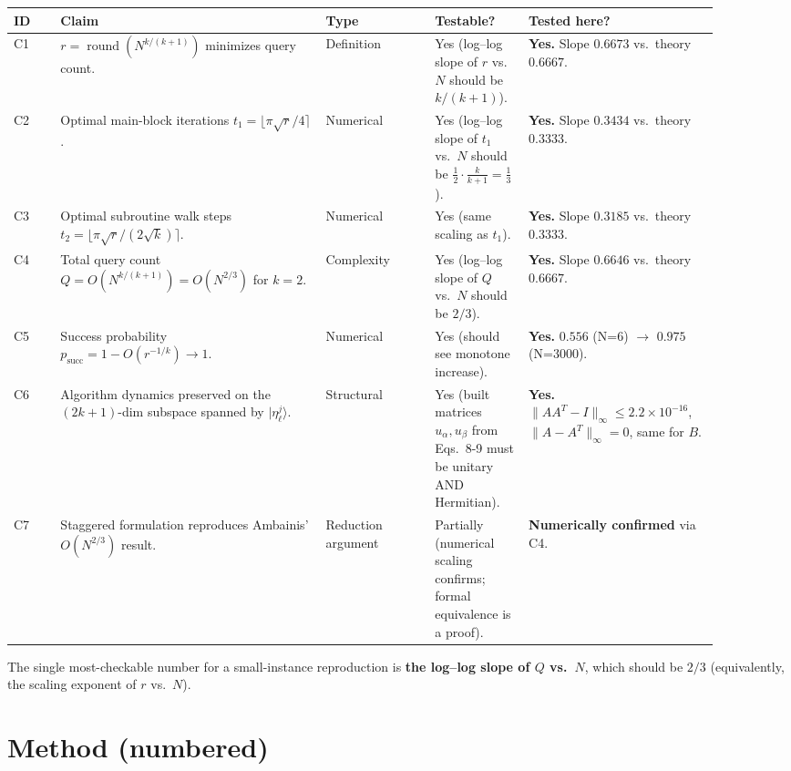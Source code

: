 \documentclass[11pt]{article}
\begin{document}
\begin{longtable}{p{0.06\linewidth} p{0.34\linewidth} p{0.14\linewidth} p{0.12\linewidth} p{0.24\linewidth}}
\toprule
\textbf{ID} & \textbf{Claim} & \textbf{Type} & \textbf{Testable?} & \textbf{Tested here?} \\
\midrule
\endhead
C1 & $r = \operatorname{round}(N^{k/(k+1)})$ minimizes query count. & Definition
   & Yes (log--log slope of $r$ vs.\ $N$ should be $k/(k+1)$).
   & \textbf{Yes.} Slope $0.6673$ vs.\ theory $0.6667$. \\
C2 & Optimal main-block iterations $t_1 = \lfloor \pi\sqrt{r}/4 \rceil$.
   & Numerical & Yes (log--log slope of $t_1$ vs.\ $N$ should be $\tfrac{1}{2}\cdot\tfrac{k}{k+1} = \tfrac{1}{3}$).
   & \textbf{Yes.} Slope $0.3434$ vs.\ theory $0.3333$. \\
C3 & Optimal subroutine walk steps $t_2 = \lfloor \pi\sqrt{r}/(2\sqrt{k}) \rceil$.
   & Numerical & Yes (same scaling as $t_1$).
   & \textbf{Yes.} Slope $0.3185$ vs.\ theory $0.3333$. \\
C4 & Total query count $Q = O(N^{k/(k+1)}) = O(N^{2/3})$ for $k=2$.
   & Complexity & Yes (log--log slope of $Q$ vs.\ $N$ should be $2/3$).
   & \textbf{Yes.} Slope $0.6646$ vs.\ theory $0.6667$. \\
C5 & Success probability $p_{\text{succ}} = 1 - O(r^{-1/k}) \to 1$.
   & Numerical & Yes (should see monotone increase).
   & \textbf{Yes.} $0.556$ (N=6) $\to$ $0.975$ (N=3000). \\
C6 & Algorithm dynamics preserved on the $(2k+1)$-dim subspace spanned by $|\eta_\ell^j\rangle$.
   & Structural & Yes (built matrices $u_\alpha, u_\beta$ from Eqs.~8-9 must be unitary AND Hermitian).
   & \textbf{Yes.} $\|A A^T - I\|_\infty \le 2.2\times 10^{-16}$, $\|A - A^T\|_\infty = 0$, same for $B$. \\
C7 & Staggered formulation reproduces Ambainis' $O(N^{2/3})$ result.
   & Reduction argument & Partially (numerical scaling confirms; formal equivalence is a proof).
   & \textbf{Numerically confirmed} via C4. \\
\bottomrule
\end{longtable}

The single most-checkable number for a small-instance reproduction is
\textbf{the log--log slope of $Q$ vs.\ $N$}, which should be $2/3$
(equivalently, the scaling exponent of $r$ vs.\ $N$).

\section{Method (numbered)}
\label{sec:method}
\end{document}

